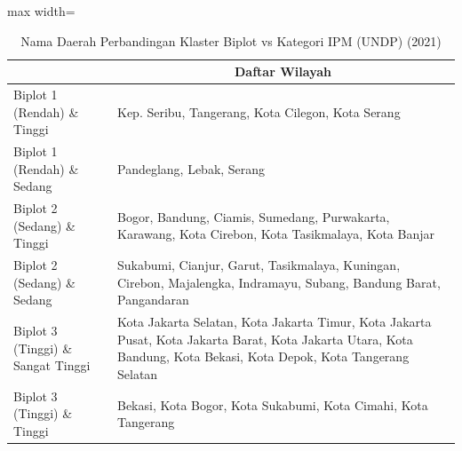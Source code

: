 \begin{table}[H]
\centering
\caption{Nama Daerah Perbandingan Klaster Biplot vs Kategori IPM (UNDP) (2021)} \label{tab:app1crossname2021}
\begin{adjustbox}{max width=\textwidth}
\begin{tabular}{|>{\centering\arraybackslash}p{4cm}|p{10cm}|}
\hline
\multicolumn{1}{|c|}{\textbf{Kategori}} & \multicolumn{1}{c|}{\textbf{Daftar Wilayah}} \\
\hline
Biplot 1 (Rendah) \& Tinggi & Kep. Seribu, Tangerang, Kota Cilegon, Kota Serang \\
\hline
Biplot 1 (Rendah) \& Sedang & Pandeglang, Lebak, Serang \\
\hline
Biplot 2 (Sedang) \& Tinggi & Bogor, Bandung, Ciamis, Sumedang, Purwakarta, Karawang, Kota Cirebon, Kota Tasikmalaya, Kota Banjar \\
\hline
Biplot 2 (Sedang) \& Sedang & Sukabumi, Cianjur, Garut, Tasikmalaya, Kuningan, Cirebon, Majalengka, Indramayu, Subang, Bandung Barat, Pangandaran \\
\hline
Biplot 3 (Tinggi) \& Sangat Tinggi & Kota Jakarta Selatan, Kota Jakarta Timur, Kota Jakarta Pusat, Kota Jakarta Barat, Kota Jakarta Utara, Kota Bandung, Kota Bekasi, Kota Depok, Kota Tangerang Selatan \\
\hline
Biplot 3 (Tinggi) \& Tinggi & Bekasi, Kota Bogor, Kota Sukabumi, Kota Cimahi, Kota Tangerang \\
\hline
\end{tabular}
\end{adjustbox}
\end{table}
